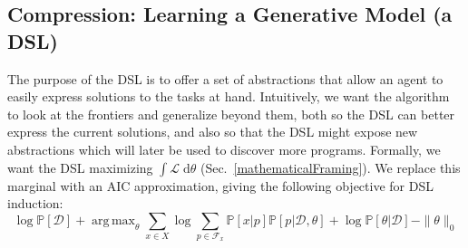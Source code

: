\documentclass{article}
\newcommand{\system}{\textsc{CoCoSea}~}
\newcommand{\lowerBound}{\mathscr{L}}
\DeclareMathOperator*{\argmax}{arg\,max} %
\newcommand{\probability}{\mathds{P}} %
\begin{document}

\subsection{Compression: Learning a Generative Model (a DSL)}\label{grammarInductionSection}

The purpose of the DSL is to
offer a set of abstractions
that allow an agent to easily express solutions to the tasks at hand.
Intuitively, we want the algorithm to
look at  the frontiers and
generalize beyond them, 
both so the DSL can better express the current solutions,
and  also so that the DSL might expose new abstractions
which will later be used to
discover more programs.
 Formally, we want the DSL maximizing $\int \lowerBound\;\mathrm{d}\theta$ (Sec.~\ref{mathematicalFraming}).
We replace this marginal with an AIC approximation, giving the following objective for DSL induction:
\begin{equation}
      \log \probability[\mathcal{D}] + \argmax_{\theta}\sum_{x\in X}\log \sum_{p\in \mathcal{F}_x}\probability[x|p]\probability[p|\mathcal{D},\theta] + \log \probability[\theta|\mathcal{D}] - \|\theta\|_0 \label{AIC}
  \end{equation}
\end{document}
